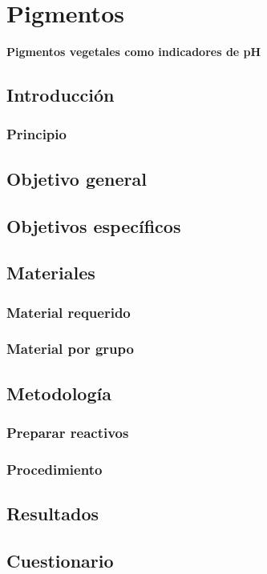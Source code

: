 \chapter[Pigmentos vegetales como indicadores de pH]{Pigmentos}

\begin{Huge}
	\begin{center}
		\textbf{Pigmentos vegetales como indicadores de pH}
	\end{center}
\end{Huge}

\section{Introducci\'on}

\subsection{Principio}

\section{Objetivo general}

\section{Objetivos espec\'ificos}

\section{Materiales}

\subsection{Material requerido}

\subsection{Material por grupo}

\section{Metodolog\'ia}

\subsection{Preparar reactivos}

\subsection{Procedimiento}

\section{Resultados}

\section{Cuestionario}